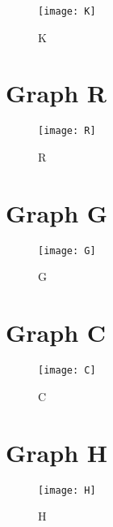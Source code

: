 \documentclass[a4paper,10pt]{article}
\begin{document}
\begin{figure}[h!]
  \centering
    \texttt{[image: K]}
  \caption{K}
\end{figure}

\section{Graph R}

\begin{figure}[h!]
  \centering
    \texttt{[image: R]}
  \caption{R}
\end{figure}

\section{Graph G}

\begin{figure}[h!]
  \centering
    \texttt{[image: G]}
  \caption{G}
\end{figure}

\section{Graph C}

\begin{figure}[h!]
  \centering
    \texttt{[image: C]}
  \caption{C}
\end{figure}


\section{Graph H}

\begin{figure}[h!]
  \centering
    \texttt{[image: H]}
  \caption{H}
\end{figure}
\end{document}
